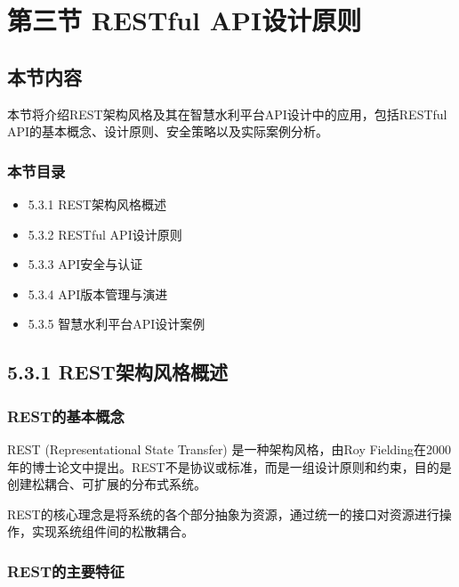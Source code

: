 \section{第三节 RESTful
API设计原则}\label{ux7b2cux4e09ux8282-restful-apiux8bbeux8ba1ux539fux5219}

\subsection{本节内容}\label{ux672cux8282ux5185ux5bb9}

本节将介绍REST架构风格及其在智慧水利平台API设计中的应用，包括RESTful
API的基本概念、设计原则、安全策略以及实际案例分析。

\subsubsection{本节目录}\label{ux672cux8282ux76eeux5f55}

\begin{itemize}
\tightlist
\item
  5.3.1 REST架构风格概述
\item
  5.3.2 RESTful API设计原则
\item
  5.3.3 API安全与认证
\item
  5.3.4 API版本管理与演进
\item
  5.3.5 智慧水利平台API设计案例
\end{itemize}

\subsection{5.3.1
REST架构风格概述}\label{restux67b6ux6784ux98ceux683cux6982ux8ff0}

\subsubsection{REST的基本概念}\label{restux7684ux57faux672cux6982ux5ff5}

REST (Representational State Transfer) 是一种架构风格，由Roy
Fielding在2000年的博士论文中提出。REST不是协议或标准，而是一组设计原则和约束，目的是创建松耦合、可扩展的分布式系统。

REST的核心理念是将系统的各个部分抽象为资源，通过统一的接口对资源进行操作，实现系统组件间的松散耦合。

\subsubsection{REST的主要特征}\label{restux7684ux4e3bux8981ux7279ux5f81}

